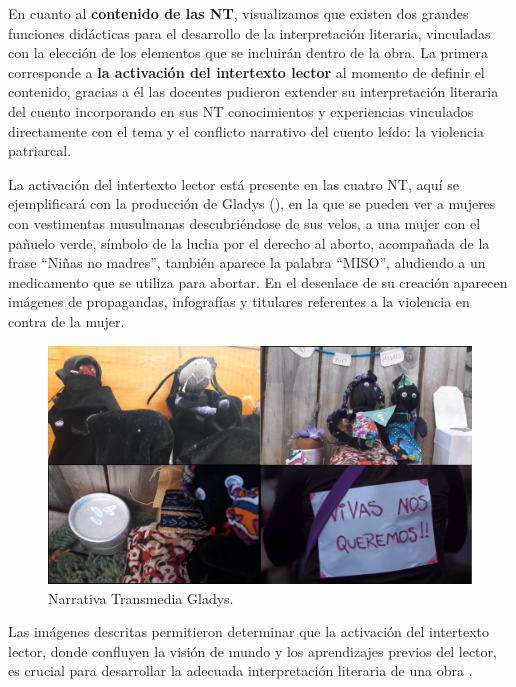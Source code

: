 \documentclass[spanish]{textolivre}
\begin{document}
En cuanto al \textbf{contenido de las NT}, visualizamos que existen dos grandes funciones didácticas para el desarrollo de la interpretación literaria, vinculadas con la elección de los elementos que se incluirán dentro de la obra. La primera corresponde a \textbf{la activación del intertexto lector} al momento de definir el contenido, gracias a él las docentes pudieron extender su interpretación literaria del cuento incorporando en sus NT conocimientos y experiencias vinculados directamente con el tema y el conflicto narrativo del cuento leído: la violencia patriarcal.

La activación del intertexto lector está presente en las cuatro NT, aquí se ejemplificará con la producción de Gladys (), en la que se pueden ver a mujeres con vestimentas musulmanas descubriéndose de sus velos, a una mujer con el pañuelo verde, símbolo de la lucha por el derecho al aborto, acompañada de la frase “Niñas no madres”, también aparece la palabra “MISO”, aludiendo a un medicamento que se utiliza para abortar. En el desenlace de su creación aparecen imágenes de propagandas, infografías y titulares referentes a la violencia en contra de la mujer. 

\begin{figure}[htbp]
 \centering
 \begin{minipage}{.85\textwidth}
 \includegraphics[width=\textwidth]{Fig1.png}
 \caption{Narrativa Transmedia Gladys.}
 \label{fig01}
 \end{minipage}
\end{figure}

Las imágenes descritas permitieron determinar que la activación del intertexto lector, donde confluyen la visión de mundo y los aprendizajes previos del lector, es crucial para desarrollar la adecuada interpretación literaria de una obra \cite{mendoza_fillola_lectura_1995,garagalza_sentido_2014}. 
\end{document}
